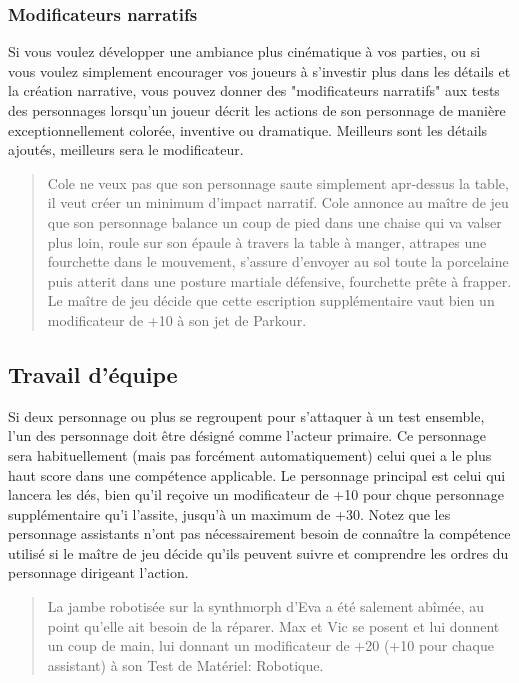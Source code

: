 \subsubsection{Modificateurs narratifs} \label{sec:narrative-modifiers} 

Si vous voulez développer une ambiance plus cinématique à vos parties, ou si vous voulez simplement encourager vos joueurs à s'investir plus dans les détails et la création narrative, vous pouvez donner des "modificateurs narratifs" aux tests des personnages lorsqu'un joueur décrit les actions de son personnage de manière exceptionnellement colorée, inventive ou dramatique. Meilleurs sont les détails ajoutés, meilleurs sera le modificateur. 

\begin{quotation} Cole ne veux pas que son personnage saute simplement apr-dessus la table, il veut créer un minimum d'impact narratif. Cole annonce au maître de jeu que son personnage balance un coup de pied dans une chaise qui va valser plus loin, roule sur son épaule à travers la table à manger, attrapes une fourchette dans le mouvement, s'assure d'envoyer au sol toute la porcelaine puis atterit dans une posture martiale défensive, fourchette prête à frapper. Le maître de jeu décide que cette escription supplémentaire vaut bien un modificateur de +10 à son jet de Parkour. \end{quotation} 

\subsection{Travail d'équipe} \label{sec:teamwork} 

Si deux personnage ou plus se regroupent pour s'attaquer à un test ensemble, l'un des personnage doit être désigné comme l'acteur primaire. Ce personnage sera habituellement (mais pas forcément automatiquement) celui quei a le plus haut score dans une compétence applicable. Le personnage principal est celui qui lancera les dés, bien qu'il reçoive un modificateur de +10 pour chque personnage supplémentaire qu'i l'assite, jusqu'à un maximum de +30. Notez que les personnage assistants n'ont pas nécessairement besoin de connaître la compétence utilisé si le maître de jeu décide qu'ils peuvent suivre et comprendre les ordres du personnage dirigeant l'action. 

\begin{quotation} La jambe robotisée sur la synthmorph d'Eva a été salement abîmée, au point qu'elle ait besoin de la réparer. Max et Vic se posent et lui donnent un coup de main, lui donnant un modificateur de +20 (+10 pour chaque assistant) à son Test de Matériel: Robotique. \end{quotation} 

